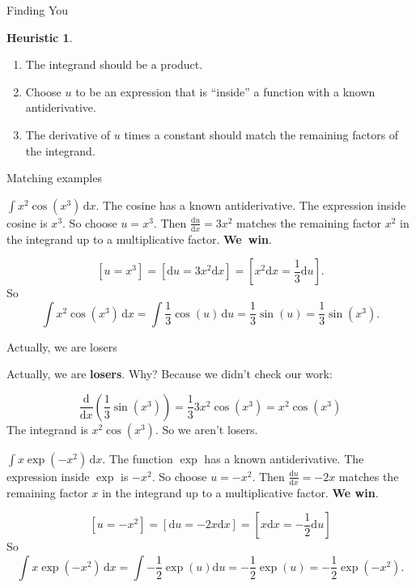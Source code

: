 \documentclass[fleqn]{beamer}
\theoremstyle{definition}
\newtheorem{heuristic}{Heuristic}
\newenvironment{checklist}{
  \begin{enumerate}[\ding{51}]
    \addtolength{\itemsep}{-0.0\itemsep}}
  {\end{enumerate}}
\begin{document}
\begin{frame}{Finding You}

\begin{heuristic}

\begin{checklist}

\item The integrand should be a product.

\item Choose \(u\) to be an expression that is ``inside'' a function with a known antiderivative.

\item The derivative of \(u\) times a constant should match the remaining factors of the integrand.
\end{checklist}

\end{heuristic}

\end{frame}

\begin{frame}{Matching examples}


 \( \int x^2 \cos(x^3) \, \mathrm{d} x \).   The cosine has a known antiderivative.  The expression inside cosine is \(x^3\).  So choose \(u = x^3\).   Then
\(\frac{\mathrm{d} u}{\mathrm{d} x} = 3 x^2\) matches the remaining factor  \(x^2\) in the integrand up to a multiplicative factor.  \mbox{\textbf{We win}}.

\[
    [u = x^3] = [\mathrm{d} u = 3 x^2 \mathrm{d} x] = \left[  x^2 \mathrm{d} x = \frac{1}{3}  \mathrm{d} u \right].
\]
So
\[
 \int x^2 \cos(x^3) \, \mathrm{d} x = \int \frac{1}{3} \cos(u) \, \mathrm{d} u = \frac{1}{3} \sin(u) =  \frac{1}{3} \sin(x^3).
\]

\end{frame}

\begin{frame}{Actually, we are losers}

Actually, we are \textbf{losers}. Why?  Because we didn't check our work:

\[
   \frac{\mathrm{d}}{\mathrm{d} x} \left(  \frac{1}{3} \sin(x^3)   \right) =   \frac{1}{3} 3 x^2 \cos(x^3)   = x^2 \cos(x^3)
\]
The integrand is  \( x^2 \cos(x^3)\).  So we aren't losers.

\end{frame}
\begin{frame}

 \( \int x  \exp(-x^2) \, \mathrm{d} x \).   The function \(\exp\)  has a known antiderivative.  The expression inside \(\exp\) is \(-x^2\).  So choose \(u =-x^2\).   Then
\(\frac{\mathrm{d} u}{\mathrm{d} x} = -2 x \) matches the remaining factor  \(x\) in the integrand up to a multiplicative factor. \textbf{We win}.


\[
    [u = -x^2] = [\mathrm{d} u = -2 x  \mathrm{d} x] = \left[  x \mathrm{d} x = -  \frac{1}{2}  \mathrm{d} u \right]
\]
So
\[
  \int x  \exp(-x^2) \, \mathrm{d} x   = \int  - \frac{1}{2} \exp(u)  \mathrm{d} u = -  \frac{1}{2}   \exp(u)  =  -  \frac{1}{2}  \exp(-x^2) .
\]

\end{frame}
\end{document}
